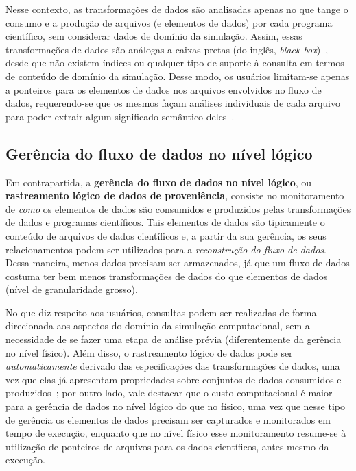 Nesse contexto, as transformações de dados são analisadas apenas no que tange o consumo e a produção de arquivos (e elementos de dados) por cada programa científico, sem considerar dados de domínio da simulação. Assim, essas transformações de dados são análogas a caixas-pretas (do inglês, \textit{black box})~\cite{silva2017raw}, desde que não existem índices ou qualquer tipo de suporte à consulta em termos de conteúdo de domínio da simulação. Desse modo, os usuários limitam-se apenas a ponteiros para os elementos de dados nos arquivos envolvidos no fluxo de dados, requerendo-se que os mesmos façam análises individuais de cada arquivo para poder extrair algum significado semântico deles~\cite{silva2015propostadoutorado}.

\subsection{Gerência do fluxo de dados no nível lógico}%
\label{sec:gerencia-do-fluxo-de-dados-no-nivel-logico}

Em contrapartida, a \textbf{gerência do fluxo de dados no nível lógico}, ou \textbf{rastreamento lógico de dados de proveniência}, consiste no monitoramento de \emph{como} os elementos de dados são consumidos e produzidos pelas transformações de dados e programas científicos. Tais elementos de dados são tipicamente o conteúdo de arquivos de dados científicos e, a partir da sua gerência, os seus relacionamentos podem ser utilizados para a \emph{reconstrução do fluxo de dados}. Dessa maneira, menos dados precisam ser armazenados, já que um fluxo de dados costuma ter bem menos transformações de dados do que elementos de dados~\cite{silva2015propostadoutorado} (nível de granularidade grosso).

No que diz respeito aos usuários, consultas podem ser realizadas de forma direcionada aos aspectos do domínio da simulação computacional, sem a necessidade de se fazer uma etapa de análise prévia (diferentemente da gerência no nível físico). Além disso, o rastreamento lógico de dados pode ser \emph{automaticamente} derivado das especificações das transformações de dados, uma vez que elas já apresentam propriedades sobre conjuntos de dados consumidos e produzidos~\cite{ikeda2013logical,silva2017raw}; por outro lado, vale destacar que o custo computacional é maior para a gerência de dados no nível lógico do que no físico, uma vez que nesse tipo de gerência os elementos de dados precisam ser capturados e monitorados em tempo de execução, enquanto que no nível físico esse monitoramento resume-se à utilização de ponteiros de arquivos para os dados científicos, antes mesmo da execução.

